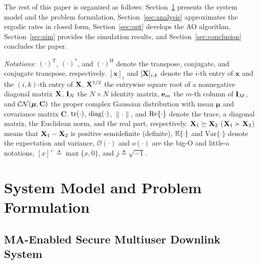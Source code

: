 \documentclass[journal]{IEEEtran}
\begin{document}
The rest of this paper is organized as follows: Section~\ref{sec:model} presents the system model and the problem formulation, Section~\ref{sec:analysis} approximates the ergodic rates in closed form, Section~\ref{sec:opt} develops the AO algorithm, Section~\ref{sec:sim} provides the simulation results, and Section~\ref{sec:conclusion} concludes the paper.

\textit{Notations:} $(\cdot)^{\mathrm T}$, $(\cdot)^*$, and $(\cdot)^{\mathrm H}$ denote the transpose, conjugate, and conjugate transpose, respectively. $[\mathbf x]_i$ and $[\mathbf{X}]_{i,k}$ denote the $i$-th entry of $\mathbf x$ and the $(i,k)$-th entry of $\mathbf{X}$, $\mathbf{X}^{1/2}$ the entrywise square root of a nonnegative diagonal matrix $\mathbf{X}$, $\mathbf{I}_N$ the $N\times N$ identity matrix, $\mathbf{e}_m$ the $m$-th column of $\mathbf{I}_M$, and $\mathcal{CN}(\boldsymbol\mu,\mathbf C)$ the proper complex Gaussian distribution with mean $\boldsymbol\mu$ and covariance matrix $\mathbf C$. $\mathrm{tr}(\cdot)$, $\mathrm{diag}(\cdot)$, $\|\cdot\|$, and $\mathrm{Re}\{\cdot\}$ denote the trace, a diagonal matrix, the Euclidean norm, and the real part, respectively. $\mathbf{X}_1\succeq\mathbf{X}_2$ ($\mathbf{X}_1\succ\mathbf{X}_2$) means that $\mathbf{X}_1-\mathbf{X}_2$ is positive semidefinite (definite), $\mathbb{E}\{\cdot\}$ and $\mathrm{Var}\{\cdot\}$ denote the expectation and variance, $\mathcal O(\cdot)$ and $o(\cdot)$ are the big-O and little-o notations, $[x]^+\triangleq\max\{x,0\}$, and $j\triangleq\sqrt{-1}$.

\section{System Model and Problem Formulation}\label{sec:model}

\subsection{MA-Enabled Secure Multiuser Downlink System}
\end{document}
